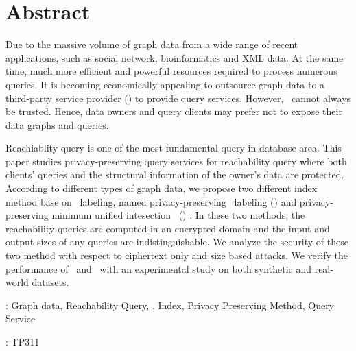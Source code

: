 \chapter*{Abstract}

Due to the massive volume of graph data from a wide range of recent
applications, such as social network, bioinformatics and XML data. At the same time, much more efficient and powerful resources required to process numerous queries.
It is becoming economically appealing to outsource graph data to a third-party
service provider (\SP) to provide query services. However, \SP\ cannot always
be trusted. Hence, data owners and query clients may prefer not to expose their
data graphs and queries.

Reachiablity query is one of the most fundamental query in database area. This paper studies privacy-preserving query services
for reachability query where both clients' queries and the structural information of the owner's data are protected.
According to different types of graph data, we propose two different index method base on \hop\   labeling, named privacy-preserving \hop\  labeling (\pphop) and privacy-preserving minimum unified intesection \hop\  (\ppmuihop) . In these two methods, the reachability queries are
computed in an encrypted domain and the input and output sizes of any queries
are indistinguishable. We analyze the security of these two method with respect to ciphertext
only and size based attacks. We verify the performance of \pphop\ and  \ppmuihop\ with an
experimental study on both synthetic and real-world datasets.
\bigskip
\bigskip

: Graph data, Reachability Query, \hop , Index, Privacy Preserving Method, Query Service%

 : TP311

